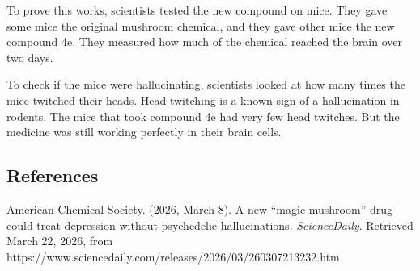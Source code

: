 To prove this works, scientists tested the new compound on mice. They gave some mice the original mushroom chemical, and they gave other mice the new compound 4e. They measured how much of the chemical reached the brain over two days.

To check if the mice were hallucinating, scientists looked at how many times the mice twitched their heads. Head twitching is a known sign of a hallucination in rodents. The mice that took compound 4e had very few head twitches. But the medicine was still working perfectly in their brain cells.

\vspace{0.5cm}
\subsection*{References}
American Chemical Society. (2026, March 8). A new ``magic mushroom'' drug could treat depression without psychedelic hallucinations. \textit{ScienceDaily}. Retrieved March 22, 2026, from https://www.sciencedaily.com/releases/2026/03/260307213232.htm